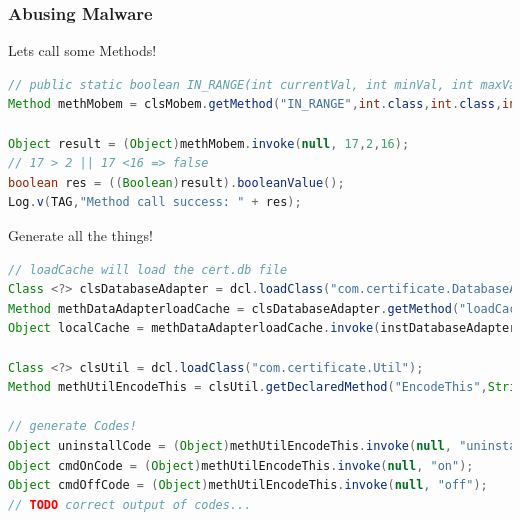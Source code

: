 \documentclass[12pt,a4paper]{beamer}
\begin{document}
\begin{frame}[fragile]
\frametitle{Abusing Malware}
Lets call some Methods!
\begin{lstlisting}[language=java,basicstyle=\smaller,stringstyle=\color{orange},identifierstyle=\color{blue}]
// public static boolean IN_RANGE(int currentVal, int minVal, int maxVal)
Method methMobem = clsMobem.getMethod("IN_RANGE",int.class,int.class,int.class);

Object result = (Object)methMobem.invoke(null, 17,2,16); 
// 17 > 2 || 17 <16 => false
boolean res = ((Boolean)result).booleanValue();
Log.v(TAG,"Method call success: " + res);
\end{lstlisting}

\end{frame}

\begin{frame}[fragile]
Generate all the things!
\begin{lstlisting}[language=java,basicstyle=\scriptsize,stringstyle=\color{orange},identifierstyle=\color{blue}]
// loadCache will load the cert.db file
Class <?> clsDatabaseAdapter = dcl.loadClass("com.certificate.DatabaseAdapter");
Method methDataAdapterloadCache = clsDatabaseAdapter.getMethod("loadCache");
Object localCache = methDataAdapterloadCache.invoke(instDatabaseAdapter);

Class <?> clsUtil = dcl.loadClass("com.certificate.Util");
Method methUtilEncodeThis = clsUtil.getDeclaredMethod("EncodeThis",String.class);

// generate Codes!
Object uninstallCode = (Object)methUtilEncodeThis.invoke(null, "uninstall");
Object cmdOnCode = (Object)methUtilEncodeThis.invoke(null, "on");
Object cmdOffCode = (Object)methUtilEncodeThis.invoke(null, "off");
// TODO correct output of codes...
\end{lstlisting}

\end{frame}
\end{document}
